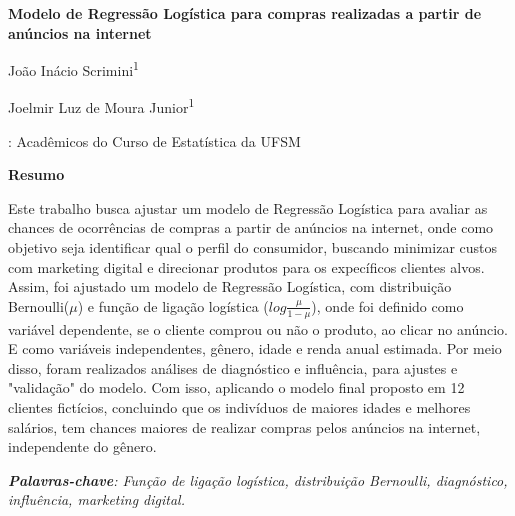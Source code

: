 \documentclass[a4paper]{article}
\begin{document}
\clearpage\setcounter{page}{1}%
\thispagestyle{FirstPage} %


\begin{center}
	\begin{LARGE}
		\textbf{Modelo de Regressão Logística para compras realizadas a partir de anúncios na internet}
	\end{LARGE}
\end{center}

\bigskip

{\centering
João Inácio Scrimini\textsuperscript{1}\par  Joelmir Luz de Moura Junior\textsuperscript{1}\par}
\bigskip
{: Acadêmicos do Curso de Estatística da UFSM 	 \par}


\bigskip


\hline
\bigskip
{\centering\bfseries\Large\color{black}Resumo 
	\par}
\smallskip

Este trabalho busca ajustar um modelo de Regressão Logística para avaliar as chances de ocorrências de compras a partir de anúncios na internet, onde como objetivo seja identificar qual o perfil do consumidor, buscando minimizar custos com marketing digital e direcionar produtos para os expecíficos clientes alvos. Assim, foi ajustado um modelo de Regressão Logística, com distribuição Bernoulli($\mu$) e função de ligação logística ($log\frac{\mu}{1-\mu}$), onde foi definido como variável dependente, se o cliente comprou ou não o produto, ao clicar no anúncio. E como variáveis independentes, gênero, idade e renda anual estimada. Por meio disso, foram realizados análises de diagnóstico e influência, para ajustes e "validação" do modelo. Com isso, aplicando o modelo final proposto em 12 clientes fictícios, concluindo que os indivíduos de maiores idades e melhores salários, tem chances maiores de realizar compras pelos anúncios na internet, independente do gênero.

\bigskip



\textit{\textbf{Palavras-chave}: Função de ligação logística, distribuição Bernoulli, diagnóstico, influência, marketing digital. }
\end{document}
